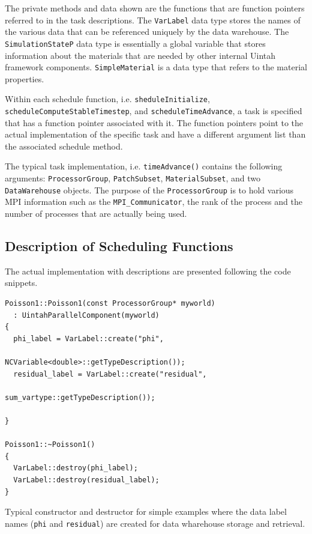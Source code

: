 \documentclass[12pt]{report}
\begin{document}
The private methods and data shown are the functions that are function
pointers referred to in the task descriptions.  The \texttt{VarLabel}
data type stores the names of the various data that can be referenced
uniquely by the data warehouse.  The \texttt{SimulationStateP} data
type is essentially a global variable that stores information about
the materials that are needed by other internal Uintah framework
components.  \texttt{SimpleMaterial} is a data type that refers to the
material properties.

Within each schedule function, i.e. \texttt{sheduleInitialize},
\texttt{scheduleComputeStableTimestep}, and
\texttt{scheduleTimeAdvance}, a task is specified that has a function
pointer associated with it.  The function pointers point to the actual
implementation of the specific task and have a different argument list
than the associated schedule method.

The typical task implementation, i.e. \texttt{timeAdvance()} contains
the following arguments: \texttt{ProcessorGroup},
\texttt{PatchSubset}, \texttt{MaterialSubset}, and two
\texttt{DataWarehouse} objects.  The purpose of the
\texttt{ProcessorGroup} is to hold various MPI information such as the
\texttt{MPI\_Communicator}, the rank of the process and the number of
processes that are actually being used.

\subsection{Description of Scheduling Functions}

The actual implementation with descriptions are presented following
the code snippets.

\begin{Verbatim}[fontsize=\footnotesize]
Poisson1::Poisson1(const ProcessorGroup* myworld)
  : UintahParallelComponent(myworld)
{
  phi_label = VarLabel::create("phi", 
                               NCVariable<double>::getTypeDescription());
  residual_label = VarLabel::create("residual", 
                                    sum_vartype::getTypeDescription());

}

Poisson1::~Poisson1()
{
  VarLabel::destroy(phi_label);
  VarLabel::destroy(residual_label);
}

\end{Verbatim}

Typical constructor and destructor for simple examples where the data
label names (\texttt{phi} and \texttt{residual}) are created for data
wharehouse storage and retrieval.
\end{document}
